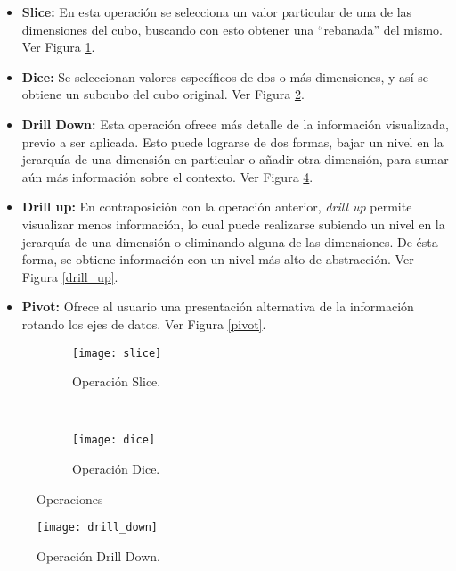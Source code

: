 \documentclass[a4paper,11pt]{article}
\begin{document}
    \begin{itemize}
      \item \textbf{Slice:} En esta operación se selecciona un valor particular de una de las dimensiones del cubo, buscando con esto obtener una ``rebanada'' del
      mismo. Ver Figura \ref{slice}.
      \item \textbf{Dice:} Se seleccionan valores específicos de dos o más dimensiones, y así se obtiene un subcubo del cubo original. Ver Figura \ref{dice}.
      \item \textbf{Drill Down:} Esta operación ofrece más detalle de la información visualizada, previo a ser aplicada. Esto puede
      lograrse de dos formas, bajar un nivel en la jerarquía de una dimensión en particular o añadir otra dimensión, para sumar aún más información sobre el contexto.
      Ver Figura \ref{drill_down}.
      \item \textbf{Drill up:} En contraposición con la operación anterior, \textit{drill up} permite visualizar menos información, lo cual puede realizarse
      subiendo un nivel en la jerarquía de una dimensión o eliminando alguna de las dimensiones. De ésta forma, se obtiene información con un nivel más alto
      de abstracción. Ver Figura \ref{drill_up}.
      \item \textbf{Pivot:} Ofrece al usuario una presentación alternativa de la información rotando los ejes de datos. Ver Figura \ref{pivot}.
    \end{itemize}
    
    \begin{figure}
        \centering
        \begin{subfigure}[b]{0.5\textwidth}
          \texttt{[image: slice]}
          \caption{Operación Slice. \cite{operaciones}}
          \label{slice}      
        \end{subfigure}%
        ~
        \begin{subfigure}[b]{0.5\textwidth}
          \texttt{[image: dice]}
          \caption{Operación Dice. \cite{operaciones}}
          \label{dice}
        \end{subfigure}
    \caption{
    \label{slice-dice}%
    Operaciones}
    \end{figure}
      
    \begin{figure}
      \begin{center}
        \texttt{[image: drill\_down]}
        \caption{Operación Drill Down. \cite{operaciones}}
        \label{drill_down}
      \end{center}
    \end{figure}
    
\end{document}
